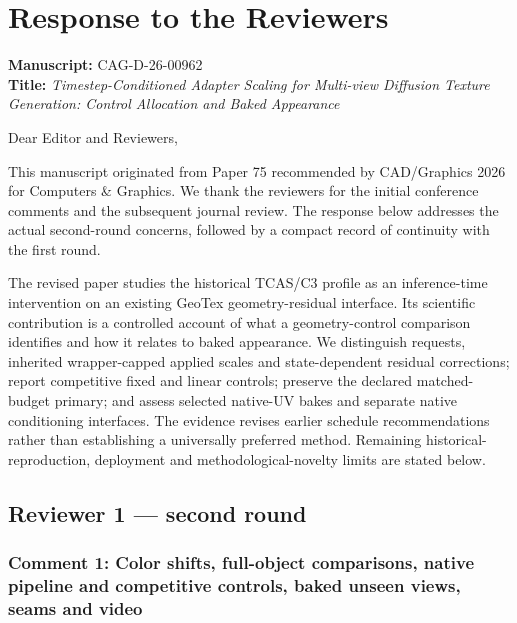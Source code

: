 \documentclass[
  10pt,
]{article}
\author{}
\date{}
\begin{document}
\hypertarget{response-to-the-reviewers}{%
\section{Response to the Reviewers}\label{response-to-the-reviewers}}

\textbf{Manuscript:} CAG-D-26-00962\\
\textbf{Title:} \emph{Timestep-Conditioned Adapter Scaling for
Multi-view Diffusion Texture Generation: Control Allocation and Baked
Appearance}

Dear Editor and Reviewers,

This manuscript originated from Paper 75 recommended by CAD/Graphics
2026 for Computers \& Graphics. We thank the reviewers for the initial
conference comments and the subsequent journal review. The response
below addresses the actual second-round concerns, followed by a compact
record of continuity with the first round.

The revised paper studies the historical TCAS/C3 profile as an
inference-time intervention on an existing GeoTex geometry-residual
interface. Its scientific contribution is a controlled account of what a
geometry-control comparison identifies and how it relates to baked
appearance. We distinguish requests, inherited wrapper-capped applied
scales and state-dependent residual corrections; report competitive
fixed and linear controls; preserve the declared matched-budget primary;
and assess selected native-UV bakes and separate native conditioning
interfaces. The evidence revises earlier schedule recommendations rather
than establishing a universally preferred method. Remaining
historical-reproduction, deployment and methodological-novelty limits
are stated below.

\hypertarget{reviewer-1-second-round}{%
\subsection{Reviewer 1 --- second round}\label{reviewer-1-second-round}}

\hypertarget{comment-1-color-shifts-full-object-comparisons-native-pipeline-and-competitive-controls-baked-unseen-views-seams-and-video}{%
\subsubsection{Comment 1: Color shifts, full-object comparisons, native
pipeline and competitive controls, baked unseen views, seams and
video}\label{comment-1-color-shifts-full-object-comparisons-native-pipeline-and-competitive-controls-baked-unseen-views-seams-and-video}}
\end{document}
